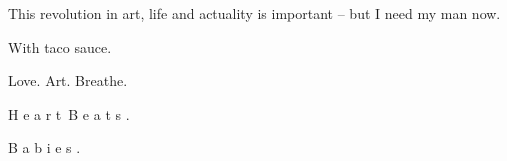 

This revolution in art, life and actuality is important -- but I need my man now.

With taco sauce.

Love.  Art.  Breathe.

H e a r t\  B e a t s .

B a b i e s .

\bye
